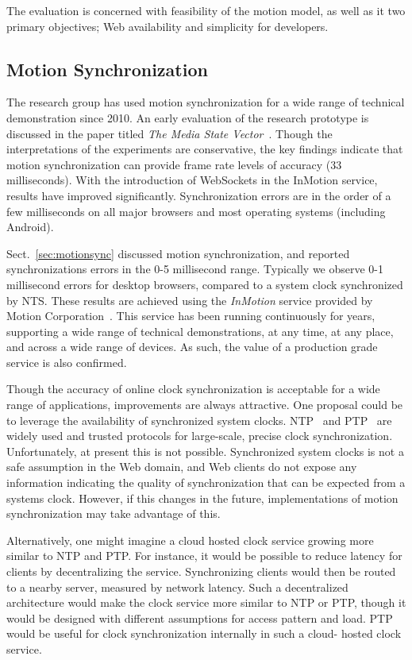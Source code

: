 The evaluation is concerned with feasibility of the motion model, as well as
it two primary objectives; Web availability and simplicity for developers.


\subsection {Motion Synchronization}

The research group has used motion synchronization for a wide range of
technical demonstration since 2010. An early evaluation of the research
prototype is discussed in the paper titled \emph{The Media State
Vector}~\cite{msv}. Though the interpretations of the experiments are
conservative, the key findings indicate that motion synchronization can
provide frame rate levels of accuracy (33 milliseconds). With the introduction
of WebSockets in the InMotion service, results have improved significantly.
Synchronization errors are in the order of a few milliseconds on all major
browsers and most operating systems (including Android).


Sect.~\ref{sec:motionsync} discussed motion synchronization, and reported
synchronizations errors in the 0-5 millisecond range. Typically we observe 0-1
millisecond errors for desktop browsers, compared to a system clock
synchronized by NTS. These results are achieved using the \emph{InMotion}
service provided by Motion Corporation~\cite{mcorp}. This service has been running
continuously for years, supporting a wide range of technical demonstrations,
at any time, at any place, and across a wide range of devices. As such, the
value of a production grade service is also confirmed.




Though the accuracy of online clock synchronization is acceptable for a wide
range of applications, improvements are always attractive. One proposal could
be to leverage the availability of synchronized system clocks. NTP~\cite{ntp}
and PTP~\cite{ptp} are widely used and trusted protocols for large-scale,
precise clock synchronization. Unfortunately, at present this is not possible.
Synchronized system clocks is not a safe assumption in the Web domain, and Web
clients do not expose any information indicating the quality of
synchronization that can be expected from a systems clock. However, if this
changes in the future, implementations of motion synchronization may take
advantage of this.

Alternatively, one might imagine a cloud hosted clock service growing more
similar to NTP and PTP. For instance, it would be possible to reduce latency
for clients by decentralizing the service. Synchronizing clients would then be
routed to a nearby server, measured by network latency. Such a decentralized
architecture would make the clock service more similar to NTP or PTP, though
it would be designed with different assumptions for access pattern and load.
PTP would be useful for clock synchronization internally in such a cloud-
hosted clock service.






